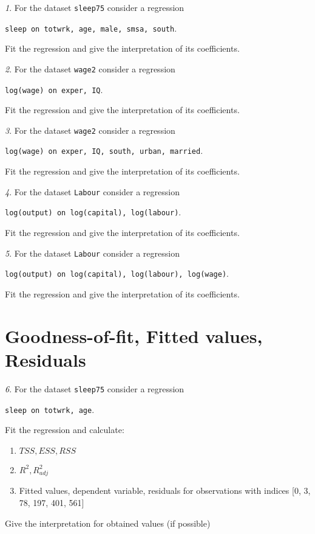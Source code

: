\documentclass[12pt]{article}
\theoremstyle{remark}
\newtheorem{problem}{}[section]
\begin{document}
\begin{problem}
For the dataset \texttt{sleep75} consider a regression
\begin{center}
\texttt{sleep on totwrk, age, male, smsa, south}.
\end{center}
Fit the regression and give the interpretation of its coefficients.
\end{problem}

\begin{problem}
For the dataset \texttt{wage2} consider a regression
\begin{center}
\texttt{log(wage) on exper, IQ}.
\end{center}
Fit the regression and give the interpretation of its coefficients.
\end{problem}

\begin{problem}
For the dataset \texttt{wage2} consider a regression
\begin{center}
\texttt{log(wage) on exper, IQ, south, urban, married}.
\end{center}
Fit the regression and give the interpretation of its coefficients.
\end{problem}

\begin{problem}
For the dataset \texttt{Labour} consider a regression
\begin{center}
\texttt{log(output) on log(capital), log(labour)}.
\end{center}
Fit the regression and give the interpretation of its coefficients.
\end{problem}

\begin{problem}
For the dataset \texttt{Labour} consider a regression
\begin{center}
\texttt{log(output) on log(capital), log(labour), log(wage)}.
\end{center}
Fit the regression and give the interpretation of its coefficients.
\end{problem}

\section{Goodness-of-fit, Fitted values, Residuals}

\begin{problem}
For the dataset \texttt{sleep75} consider a regression
\begin{center}
\texttt{sleep on totwrk, age}.
\end{center}
Fit the regression and calculate:
\begin{enumerate}
	\item \(TSS, ESS, RSS\)
	\item \(R^2, R^2_{adj}\)
	\item Fitted values, dependent variable, residuals 
	for observations with indices [0, 3, 78, 197, 401, 561]
\end{enumerate}
Give the interpretation for obtained values (if possible)
\end{problem}
\end{document}
